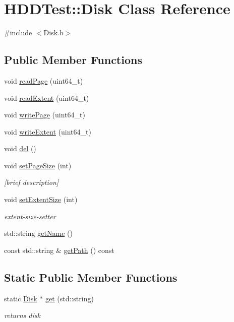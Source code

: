 \hypertarget{class_h_d_d_test_1_1_disk}{\section{H\-D\-D\-Test\-:\-:Disk Class Reference}
\label{class_h_d_d_test_1_1_disk}
}


{\ttfamily \#include $<$Disk.\-h$>$}

\subsection*{Public Member Functions}
\begin{DoxyCompactItemize}
\item 
void \hyperlink{class_h_d_d_test_1_1_disk_a5afff4786de776408acd86e3a91206c7}{read\-Page} (uint64\-\_\-t)
\item 
void \hyperlink{class_h_d_d_test_1_1_disk_adb3541b1531a7029e5d688f123df9baf}{read\-Extent} (uint64\-\_\-t)
\item 
void \hyperlink{class_h_d_d_test_1_1_disk_a538c61b9ff956231d7f05d19419eada1}{write\-Page} (uint64\-\_\-t)
\item 
void \hyperlink{class_h_d_d_test_1_1_disk_a4954ba9185b24bb98828934cb116b8dd}{write\-Extent} (uint64\-\_\-t)
\item 
void \hyperlink{class_h_d_d_test_1_1_disk_a08131fbb8f001b5f8b60056308f5a8da}{del} ()
\item 
void \hyperlink{class_h_d_d_test_1_1_disk_a161bd5f5921eb78bdd7a51757267e61b}{set\-Page\-Size} (int)
\begin{DoxyCompactList}\small\item\em \mbox{[}brief description\mbox{]} \end{DoxyCompactList}\item 
void \hyperlink{class_h_d_d_test_1_1_disk_a78e515afa9536ed390d317c1f595fe9e}{set\-Extent\-Size} (int)
\begin{DoxyCompactList}\small\item\em extent-\/size-\/setter \end{DoxyCompactList}\item 
std\-::string \hyperlink{class_h_d_d_test_1_1_disk_a60304c382744f4729813d29a68a41cc0}{get\-Name} ()
\item 
const std\-::string \& \hyperlink{class_h_d_d_test_1_1_disk_aa07e489920a40f8edf6531f343689ed4}{get\-Path} () const 
\end{DoxyCompactItemize}
\subsection*{Static Public Member Functions}
\begin{DoxyCompactItemize}
\item 
static \hyperlink{class_h_d_d_test_1_1_disk}{Disk} $\ast$ \hyperlink{class_h_d_d_test_1_1_disk_a0f6006970c964527bb5a2e6e0cb16b87}{get} (std\-::string)
\begin{DoxyCompactList}\small\item\em returns disk \end{DoxyCompactList}\end{DoxyCompactItemize}

